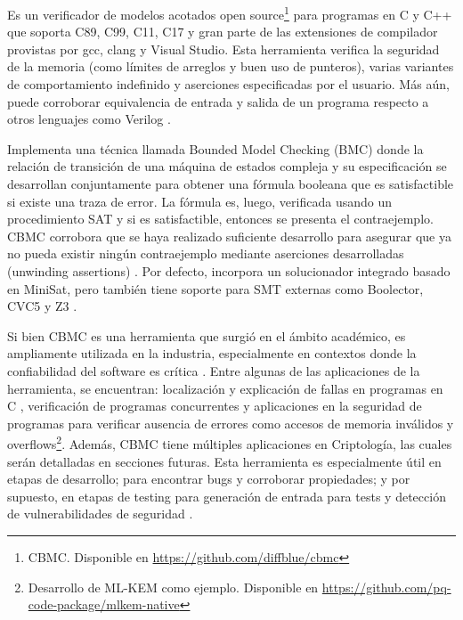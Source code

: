 \documentclass[runningheads]{llncs}
\begin{document}
Es un verificador de modelos acotados open source\footnote{CBMC. Disponible en \url{https://github.com/diffblue/cbmc}} para programas en C y C++ que soporta C89, C99, C11, C17 
y gran parte de las extensiones de compilador provistas por gcc, clang y Visual Studio.
Esta herramienta verifica la seguridad de la memoria (como límites de arreglos y buen uso de punteros), varias variantes de comportamiento indefinido y aserciones
especificadas por el usuario.
Más aún, puede corroborar equivalencia de entrada y salida de un programa respecto a otros lenguajes como Verilog \cite{cbmc-website}.

Implementa una técnica llamada Bounded Model Checking (BMC) donde la relación de transición de una máquina de estados compleja y su especificación se desarrollan
conjuntamente para obtener una fórmula booleana que es satisfactible si existe una traza de error.
La fórmula es, luego, verificada usando un procedimiento SAT y si es satisfactible, entonces se presenta el contraejemplo.
CBMC corrobora que se haya realizado suficiente desarrollo para asegurar que ya no pueda existir ningún contraejemplo mediante aserciones desarrolladas (unwinding assertions) \cite{tacas-2004}.
Por defecto, incorpora un solucionador integrado basado en MiniSat, pero también tiene soporte para SMT externas como Boolector, CVC5 y Z3 \cite{cbmc-website}.

Si bien CBMC es una herramienta que surgió en el ámbito académico, es ampliamente utilizada en la industria, especialmente en contextos donde la confiabilidad 
del software es crítica \cite{cbmc-paper}.
Entre algunas de las aplicaciones de la herramienta, se encuentran: localización y explicación de fallas en programas en C \cite{fails-explanation}, verificación
de programas concurrentes \cite{cbmc-concurrent} y aplicaciones en la seguridad de programas para verificar ausencia de errores como accesos de memoria inválidos
y overflows\footnote{Desarrollo de ML-KEM como ejemplo. Disponible en \url{https://github.com/pq-code-package/mlkem-native}}.
Además, CBMC tiene múltiples aplicaciones en Criptología, las cuales serán detalladas en secciones futuras.
Esta herramienta es especialmente útil en etapas de desarrollo; para encontrar bugs y corroborar propiedades; y por supuesto, en etapas de testing para generación 
de entrada para tests y detección de vulnerabilidades de seguridad \cite{cbmc-paper}.
\end{document}
